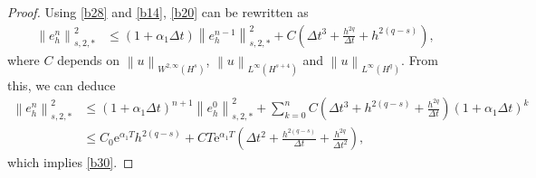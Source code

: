 \documentclass[10pt,a4paper]{amsart}
\def\norm#1#2{\left\|#2\right\|_{#1}}
\begin{document}
\begin{proof}
  Using \eqref{b28} and \eqref{b14}, \eqref{b20} can be rewritten as 
  \begin{align} 
    \norm{s, 2, \ast}{e_h^n}^2 & \leq \left(1 + \alpha_1 \Delta t \right) \norm{s, 2, \ast}{e_h^{n - 1}}^2 + C \left(\Delta t^3 + \frac{h^{2q}}{\Delta t} + h^{2 (q - s)}\right), 
  \end{align} 
  where $ C $ depends on $ \norm{W^{2, \infty}(H^{s})}{u} $, $ \norm{L^{\infty}(H^{s+4})}{u} $ and $ \norm{L^{\infty}(H^{q})}{u} $. From this, we can deduce 
  \begin{align} 
    \norm{s, 2, \ast}{e_h^n}^2 & \leq \left(1 + \alpha_1 \Delta t \right)^{n + 1} \norm{s, 2, \ast}{e_h^0}^2 + \sum_{k = 0}^{n} C \left(\Delta t^3 + h^{2 (q - s)} + \frac{h^{2q}}{\Delta t}\right) \left(1 + \alpha_1 \Delta t \right)^k \\ 
    & \leq C_0 \mathrm{e}^{\alpha_1 T} h^{2 (q - s)} + C T \mathrm{e}^{\alpha_1 T} \left(\Delta t^2 + \frac{h^{2 (q - s)}}{\Delta t} + \frac{h^{2q}}{\Delta t^2}\right), 
  \end{align} 
  which implies \eqref{b30}. 
\end{proof} 
\end{document}
